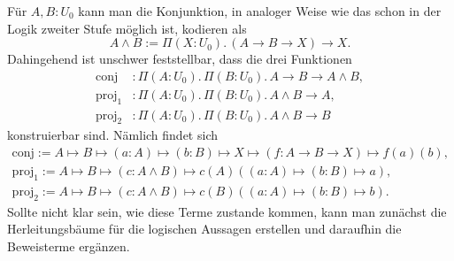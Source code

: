 Für $A,B\colon U_0$ kann man die Konjunktion, in analoger Weise wie das
schon in der Logik zweiter Stufe möglich ist, kodieren als
\[A\land B := \Pi(X\colon U_0).\, (A\to B\to X)\to X.\]
Dahingehend ist unschwer feststellbar, dass die drei Funktionen
\begin{align*}
\mathrm{conj}&\colon \Pi(A\colon U_0).\,\Pi(B\colon U_0).\,A\to B\to A\land B,\\
\mathrm{proj}_1&\colon \Pi(A\colon U_0).\,\Pi(B\colon U_0).\, A\land B\to A,\\
\mathrm{proj}_2&\colon \Pi(A\colon U_0).\,\Pi(B\colon U_0).\, A\land B\to B
\end{align*}
konstruierbar sind. Nämlich findet sich
\begin{gather*}
\mathrm{conj} := A\mapsto B\mapsto (a\colon A)\mapsto (b\colon B)\mapsto X\mapsto (f\colon A\to B\to X)\mapsto f(a)(b),\\
\mathrm{proj}_1 := A\mapsto B\mapsto (c\colon A\land B)\mapsto c(A)((a\colon A)\mapsto (b\colon B)\mapsto a),\\
\mathrm{proj}_2 := A\mapsto B\mapsto (c\colon A\land B)\mapsto c(B)((a\colon A)\mapsto (b\colon B)\mapsto b).
\end{gather*}
Sollte nicht klar sein, wie diese Terme zustande kommen, kann man zunächst
die Herleitungsbäume für die logischen Aussagen erstellen und daraufhin
die Beweisterme ergänzen.
